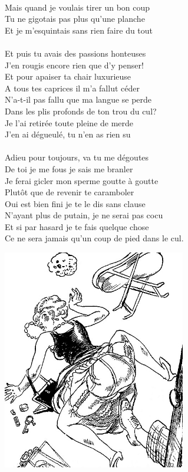 \\Mais quand je voulais tirer un bon coup
\\Tu ne gigotais pas plus qu'une planche
\\Et je m'esquintais sans rien faire du tout
\breakpage
\\\\Et puis tu avais des passions honteuses
\\J'en rougis encore rien que d'y penser!
\\Et pour apaiser ta chair luxurieuse
\\A tous tes caprices il m'a fallut céder
\\N'a-t-il pas fallu que ma langue se perde
\\Dans les plis profonds de ton trou du cul?
\\Je l'ai retirée toute pleine de merde
\\J'en ai dégueulé, tu n'en as rien su
\\\\Adieu pour toujours, va tu me dégoutes
\\De toi je me fous je sais me branler
\\Je ferai gicler mon sperme goutte à goutte
\\Plutôt que de revenir te caramboler
\\Oui est bien fini je te le dis sans clause
\\N'ayant plus de putain, je ne serai pas cocu
\\Et si par hasard je te fais quelque chose
\\Ce ne sera jamais qu'un coup de pied dans le cul.
\\
\bigskip
\begin{center}
\includegraphics[width=0.6\textwidth]{images/StancesASophie.jpg}
\end{center}

\breakpage